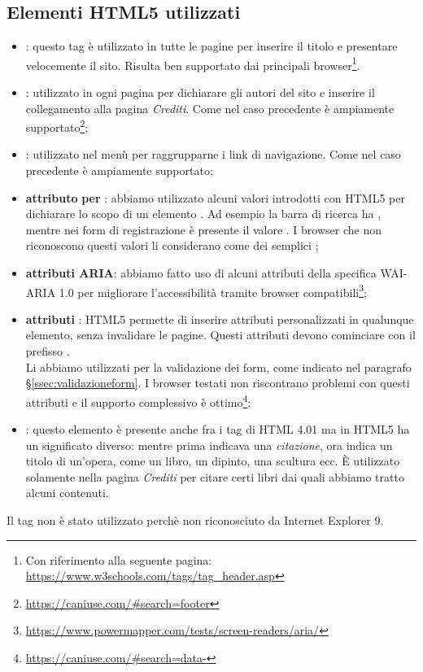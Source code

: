 \documentclass[12pt]{article}
\begin{document}
	\subsection{Elementi HTML5 utilizzati}
	\begin{itemize}
		\item {}: questo tag è utilizzato in tutte le pagine per inserire il titolo e presentare velocemente il sito. Risulta ben supportato dai principali browser\footnote{Con riferimento alla seguente pagina: \url{https://www.w3schools.com/tags/tag_header.asp}}.
		\item {}: utilizzato in ogni pagina per dichiarare gli autori del sito e inserire il collegamento alla pagina \textit{Crediti}. Come nel caso precedente è ampiamente supportato\footnote{\url{https://caniuse.com/\#search=footer}};
		\item {}: utilizzato nel menù per raggrupparne i link di navigazione. Come nel caso precedente è ampiamente supportato;
		\item \textbf{attributo}  \textbf{per} : abbiamo utilizzato alcuni valori introdotti con HTML5 per dichiarare lo scopo di un elemento . Ad esempio la barra di ricerca ha , mentre nei form di registrazione è presente il valore . I browser che non riconoscono questi valori li considerano come dei semplici ;
		\item \textbf{attributi ARIA}: abbiamo fatto uso di alcuni attributi della specifica WAI-ARIA 1.0 per migliorare l'accessibilità tramite browser compatibili\footnote{\url{https://www.powermapper.com/tests/screen-readers/aria/}};
		\item \textbf{attributi} : HTML5 permette di inserire attributi personalizzati in qualunque elemento, senza invalidare le pagine. Questi attributi devono cominciare con il prefisso .\\Li abbiamo utilizzati per la validazione dei form, come indicato nel paragrafo §\ref{ssec:validazioneform}. I browser testati non riscontrano problemi con questi attributi e il supporto complessivo è ottimo\footnote{\url{https://caniuse.com/\#search=data-}};
		\item {}: questo elemento è presente anche fra i tag di HTML 4.01 ma in HTML5 ha un significato diverso: mentre prima indicava una \textit{citazione}, ora indica un titolo di un'opera, come un libro, un dipinto, una scultura ecc. È utilizzato solamente nella pagina \textit{Crediti} per citare certi libri dai quali abbiamo tratto alcuni contenuti.
	\end{itemize}
	Il tag  non è stato utilizzato perchè non riconosciuto da Internet Explorer 9.
	
\end{document}
